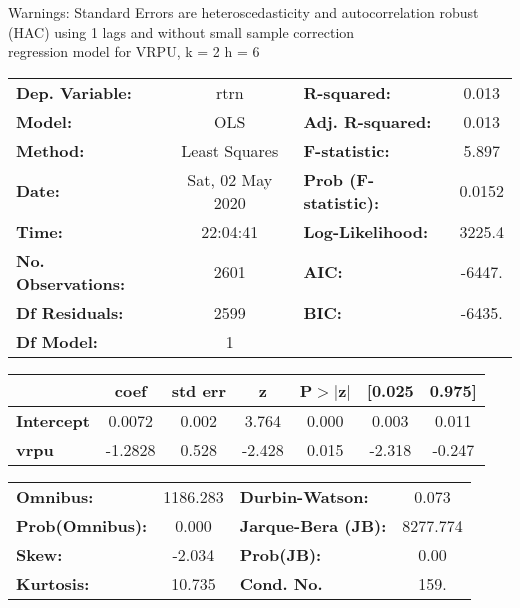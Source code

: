 Warnings: \newline
 [1] Standard Errors are heteroscedasticity and autocorrelation robust (HAC) using 1 lags and without small sample correction\\ 

regression model for VRPU, k = 2 h = 6\begin{center}
\begin{tabular}{lclc}
\toprule
\textbf{Dep. Variable:}    &       rtrn       & \textbf{  R-squared:         } &     0.013   \\
\textbf{Model:}            &       OLS        & \textbf{  Adj. R-squared:    } &     0.013   \\
\textbf{Method:}           &  Least Squares   & \textbf{  F-statistic:       } &     5.897   \\
\textbf{Date:}             & Sat, 02 May 2020 & \textbf{  Prob (F-statistic):} &   0.0152    \\
\textbf{Time:}             &     22:04:41     & \textbf{  Log-Likelihood:    } &    3225.4   \\
\textbf{No. Observations:} &        2601      & \textbf{  AIC:               } &    -6447.   \\
\textbf{Df Residuals:}     &        2599      & \textbf{  BIC:               } &    -6435.   \\
\textbf{Df Model:}         &           1      & \textbf{                     } &             \\
\bottomrule
\end{tabular}
\begin{tabular}{lcccccc}
                   & \textbf{coef} & \textbf{std err} & \textbf{z} & \textbf{P$> |$z$|$} & \textbf{[0.025} & \textbf{0.975]}  \\
\midrule
\textbf{Intercept} &       0.0072  &        0.002     &     3.764  &         0.000        &        0.003    &        0.011     \\
\textbf{vrpu}      &      -1.2828  &        0.528     &    -2.428  &         0.015        &       -2.318    &       -0.247     \\
\bottomrule
\end{tabular}
\begin{tabular}{lclc}
\textbf{Omnibus:}       & 1186.283 & \textbf{  Durbin-Watson:     } &    0.073  \\
\textbf{Prob(Omnibus):} &   0.000  & \textbf{  Jarque-Bera (JB):  } & 8277.774  \\
\textbf{Skew:}          &  -2.034  & \textbf{  Prob(JB):          } &     0.00  \\
\textbf{Kurtosis:}      &  10.735  & \textbf{  Cond. No.          } &     159.  \\
\bottomrule
\end{tabular}
\end{center}

